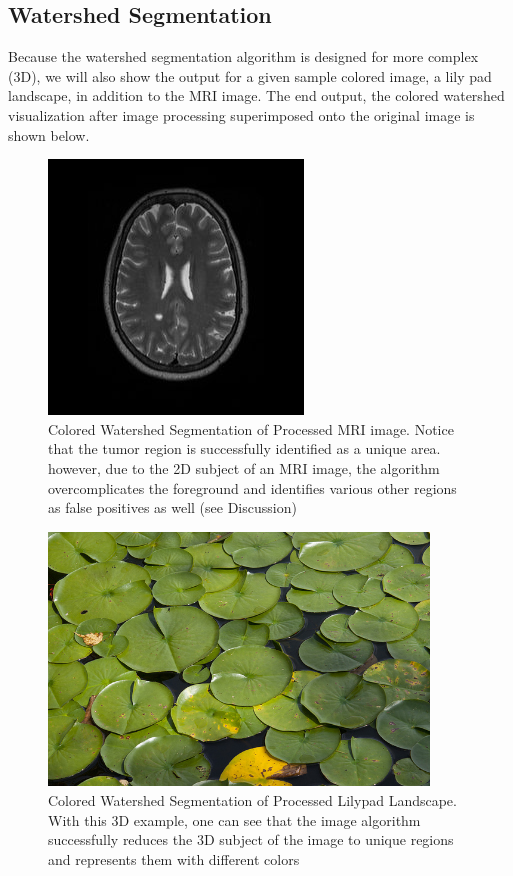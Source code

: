 \documentclass[12pt]{article}
\theoremstyle{plain}%
\theoremstyle{definition}
\theoremstyle{remark}
\begin{document}
\subsection{Watershed Segmentation}

Because the watershed segmentation algorithm is designed for more complex (3D), we will also show the output for a given sample colored image, a lily pad landscape, in addition to the MRI image. The end output, the colored watershed visualization after image processing superimposed onto the original image is shown below.

\begin{figure}[!h]
	\centering
		\includegraphics{original.jpg}
	\caption{Colored Watershed Segmentation of Processed MRI image.  Notice that the tumor region is successfully identified as a unique area.  however, due to the 2D subject of an MRI image, the algorithm overcomplicates the foreground and identifies various other regions as false positives as well (see Discussion)}
\end{figure}

\begin{figure}[!h]
	\centering
		\includegraphics[width=0.9\textwidth]{lilypad.jpg}
	\caption{Colored Watershed Segmentation of Processed Lilypad Landscape.  With this 3D example, one can see that the image algorithm successfully reduces the 3D subject of the image to unique regions and represents them with different colors}
\end{figure}
\end{document}
